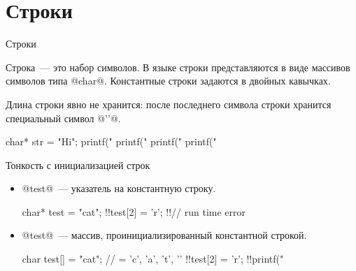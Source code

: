 \section{Строки}

\begin{frame}[fragile]{Строки}

  Строка~--- это набор символов. В языке  строки представляются в виде
  массивов символов типа @char@. Константные строки задаются в двойных
  кавычках.

  \pause
  Длина строки явно не хранится: после последнего символа строки хранится
  специальный символ @'\0'@.

  \pause
  \begin{clisting}
    char* str = "Hi";
    printf("%
    printf("%
    printf("%
    printf("%
  \end{clisting}



\end{frame}

\begin{frame}[fragile]{Тонкость с инициализацией строк}

  \begin{itemize}
    \item
      @test@~--- указатель на константную строку.
      \begin{clisting}[escapechar=!]
        char* test = "cat";
        !!test[2] = 'r'; !!// run time error
      \end{clisting}

    \item
      @test@~--- массив, проинициализированный константной строкой.
      \begin{clisting}[escapechar=!]
        char test[] = "cat"; // = {'c', 'a', 't', '\0'}
        !!test[2] = 'r';
        !!printf("%
      \end{clisting}

  \end{itemize}

\end{frame}

